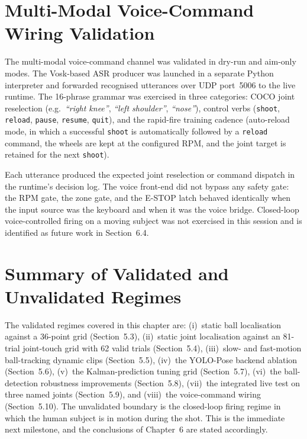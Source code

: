 \section{Multi-Modal Voice-Command Wiring Validation}
\label{sec:5_voice_wiring}

The multi-modal voice-command channel was validated in dry-run and aim-only modes. The Vosk-based ASR producer was launched in a separate Python interpreter and forwarded recognised utterances over UDP port~5006 to the live runtime. The 16-phrase grammar was exercised in three categories: COCO joint reselection (e.g.\ \textit{``right knee''}, \textit{``left shoulder''}, \textit{``nose''}), control verbs (\texttt{shoot}, \texttt{reload}, \texttt{pause}, \texttt{resume}, \texttt{quit}), and the rapid-fire training cadence (auto-reload mode, in which a successful \texttt{shoot} is automatically followed by a \texttt{reload} command, the wheels are kept at the configured RPM, and the joint target is retained for the next \texttt{shoot}).

Each utterance produced the expected joint reselection or command dispatch in the runtime's decision log. The voice front-end did not bypass any safety gate: the RPM gate, the zone gate, and the E-STOP latch behaved identically when the input source was the keyboard and when it was the voice bridge. Closed-loop voice-controlled firing on a moving subject was not exercised in this session and is identified as future work in Section~6.4.


\section{Summary of Validated and Unvalidated Regimes}
\label{sec:5_summary}

The validated regimes covered in this chapter are: (i)~static ball localisation against a 36-point grid (Section~5.3), (ii)~static joint localisation against an 81-trial joint-touch grid with 62 valid trials (Section~5.4), (iii)~slow- and fast-motion ball-tracking dynamic clips (Section~5.5), (iv)~the YOLO-Pose backend ablation (Section~5.6), (v)~the Kalman-prediction tuning grid (Section~5.7), (vi)~the ball-detection robustness improvements (Section~5.8), (vii)~the integrated live test on three named joints (Section~5.9), and (viii)~the voice-command wiring (Section~5.10). The unvalidated boundary is the closed-loop firing regime in which the human subject is in motion during the shot. This is the immediate next milestone, and the conclusions of Chapter~6 are stated accordingly.
